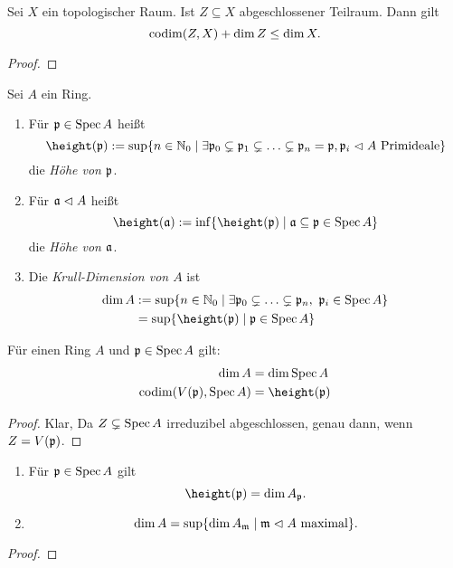 \begin{lemma}
    Sei $X$ ein topologischer Raum. 
    Ist $Z\subseteq X$ abgeschlossener Teilraum. Dann gilt
    \[\operatorname{codim}(Z,X) + \dim Z \leq \dim X.\]
\end{lemma}
\begin{proof}
\TODO
\end{proof}

\begin{definition}
    Sei $A$ ein Ring.
    \begin{enumerate}[label=(\roman*)]
      \item Für $\mathfrak{p} \in \operatorname{Spec} A$ heißt
        \[ \height(\p) := \sup\{n \in \N_0 \mid 
            \exists \p_0 \subsetneq \p_1 \subsetneq \ldots \subsetneq \p_n = \p,
             \p_i \ideal A \text{ Primideale}\}\]
        die \emph{Höhe von $\mathfrak{p}$}.
      \item Für $\mathfrak{a} \vartriangleleft A$ heißt 
        \[\height(\a) := \inf\{\height(\p) \mid \a \subseteq \p \in \Spec A\}\]
        die \emph{Höhe von $\mathfrak{a}$}.
      \item Die \emph{Krull-Dimension von $A$} ist
        \begin{align*}
            \dim A &:=\sup\{ n\in \N_0 \mid \exists \p_0 \subsetneq \ldots 
                \subsetneq \p_n,\ \p_i\in\Spec A\}\\
                &= \sup\{\height(\p)\mid \p \in \Spec A\}
        \end{align*} 
    \end{enumerate}
\end{definition}

\begin{satz}
    Für einen Ring $A$ und $\mathfrak{p} \in \operatorname{Spec} A$ gilt:
    \begin{align*}
        \dim A &= \dim\Spec A\\
        \codim(V(\p), \Spec A) &= \height(\p)
    \end{align*}
\end{satz}
\begin{proof}
    Klar, Da $Z\subsetneq \operatorname{Spec} A$ irreduzibel abgeschlossen, genau dann, wenn
    $ Z = V(\mathfrak{p})$.
\end{proof}

\begin{lemma}
    \begin{enumerate}[label=(\roman*)]
      \item Für $\mathfrak{p}\in\operatorname{Spec} A$ gilt
        \[\height(\p) = \dim A_\p.\]
      \item 
        \[\dim A = \sup\{ \dim A_\mathfrak{m} \mid \mathfrak{m} \vartriangleleft A\text{ maximal}\}.\] 
    \end{enumerate}
\end{lemma}
\begin{proof}
\TODO
\end{proof}


